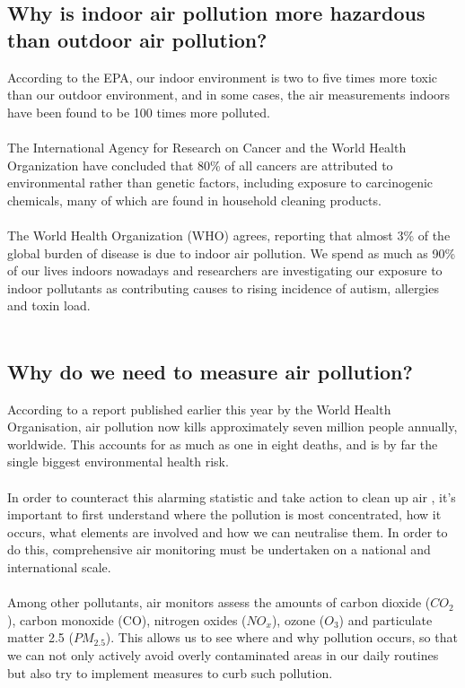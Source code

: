 \subsection{Why is indoor air pollution more hazardous than outdoor air pollution?}

According to the EPA, our indoor environment is two to five times more toxic than our outdoor environment, and in some cases, the air measurements indoors have been found to be 100 times more polluted.
\\
\\
The International Agency for Research on Cancer and the World Health Organization have concluded that 80\% of all cancers are attributed to environmental rather than genetic factors, including exposure to carcinogenic chemicals, many of which are found in household cleaning products.
\\
\\
The World Health Organization (WHO) agrees, reporting that almost 3\% of the global burden of disease is due to indoor air pollution. We spend as much as 90\% of our lives indoors nowadays and researchers are investigating our exposure to indoor pollutants as contributing causes to rising incidence of autism, allergies and toxin load.
\\
\\
\subsection{Why do we need to measure air pollution?}

According to a report published earlier this year by the World Health Organisation, air pollution now kills approximately seven million people annually, worldwide. This accounts for as much as one in eight deaths, and is by far the single biggest environmental health risk.
\\
\\
In order to counteract this alarming statistic and take action to clean up air , it’s important to first understand where the pollution is most concentrated, how it occurs, what elements are involved and how we can neutralise them. In order to do this, comprehensive air monitoring must be undertaken on a national and international scale.
\\
\\
Among other pollutants, air monitors assess the amounts of carbon dioxide ($CO_2$), carbon monoxide (CO), nitrogen oxides ($NO_x$), ozone ($O_3$) and particulate matter 2.5 ($PM_{2.5}$). This allows us to see where and why pollution occurs, so that we can not only actively avoid overly contaminated areas in our daily routines but also try to implement measures to curb such pollution.

